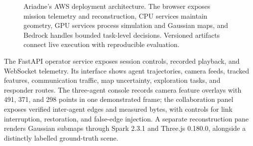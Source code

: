\documentclass[10pt,a4paper]{article}
\begin{document}
\begin{figure}[t]
\centering
{}
\caption{Ariadne's AWS deployment architecture. The browser exposes
mission telemetry and reconstruction, CPU services maintain geometry,
GPU services process simulation and Gaussian maps, and Bedrock
handles bounded task-level decisions. Versioned artifacts connect
live execution with reproducible evaluation.}
\label{fig:aws-deployment}
\end{figure}

The FastAPI operator service exposes session controls, recorded
playback, and WebSocket telemetry. Its interface shows agent
trajectories, camera feeds, tracked features, communication traffic,
map uncertainty, exploration tasks, and responder routes. The
three-agent console records camera feature overlays with 491,
371, and 298 points in one demonstrated frame; the collaboration
panel exposes verified inter-agent edges and measured bytes,
with controls for link interruption, restoration, and false-edge
injection. A separate reconstruction pane renders Gaussian submaps
through Spark 2.3.1 and Three.js 0.180.0, alongside a distinctly
labelled ground-truth scene.
\end{document}
